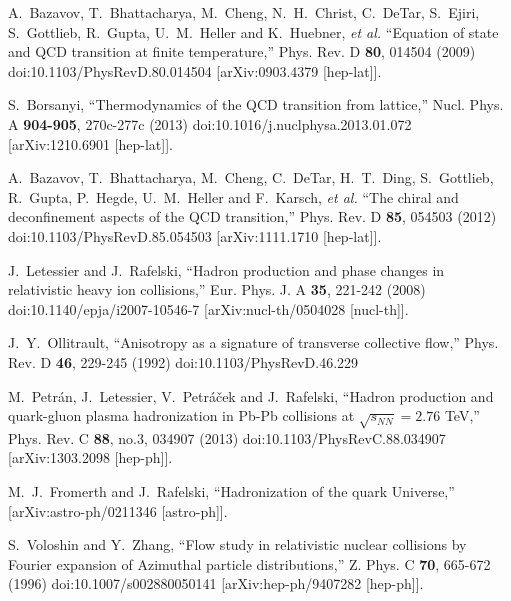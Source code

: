 \begin{thebibliography}{99}
A.~Bazavov, T.~Bhattacharya, M.~Cheng, N.~H.~Christ, C.~DeTar, S.~Ejiri, S.~Gottlieb, R.~Gupta, U.~M.~Heller and K.~Huebner, \textit{et al.}
``Equation of state and QCD transition at finite temperature,''
Phys. Rev. D \textbf{80}, 014504 (2009)
doi:10.1103/PhysRevD.80.014504
[arXiv:0903.4379 [hep-lat]].

S.~Borsanyi,
``Thermodynamics of the QCD transition from lattice,''
Nucl. Phys. A \textbf{904-905}, 270c-277c (2013)
doi:10.1016/j.nuclphysa.2013.01.072
[arXiv:1210.6901 [hep-lat]].

A.~Bazavov, T.~Bhattacharya, M.~Cheng, C.~DeTar, H.~T.~Ding, S.~Gottlieb, R.~Gupta, P.~Hegde, U.~M.~Heller and F.~Karsch, \textit{et al.}
``The chiral and deconfinement aspects of the QCD transition,''
Phys. Rev. D \textbf{85}, 054503 (2012)
doi:10.1103/PhysRevD.85.054503
[arXiv:1111.1710 [hep-lat]].

J.~Letessier and J.~Rafelski,
``Hadron production and phase changes in relativistic heavy ion collisions,''
Eur. Phys. J. A \textbf{35}, 221-242 (2008)
doi:10.1140/epja/i2007-10546-7
[arXiv:nucl-th/0504028 [nucl-th]].

J.~Y.~Ollitrault,
``Anisotropy as a signature of transverse collective flow,''
Phys. Rev. D \textbf{46}, 229-245 (1992)
doi:10.1103/PhysRevD.46.229

M.~Petr\'an, J.~Letessier, V.~Petr\'a\v{c}ek and J.~Rafelski,
``Hadron production and quark-gluon plasma hadronization in Pb-Pb collisions at $\sqrt{s_{NN}}=2.76$ TeV,''
Phys. Rev. C \textbf{88}, no.3, 034907 (2013)
doi:10.1103/PhysRevC.88.034907
[arXiv:1303.2098 [hep-ph]].

M.~J.~Fromerth and J.~Rafelski,
``Hadronization of the quark Universe,''
[arXiv:astro-ph/0211346 [astro-ph]].

S.~Voloshin and Y.~Zhang,
``Flow study in relativistic nuclear collisions by Fourier expansion of Azimuthal particle distributions,''
Z. Phys. C \textbf{70}, 665-672 (1996)
doi:10.1007/s002880050141
[arXiv:hep-ph/9407282 [hep-ph]].


\end{thebibliography}
